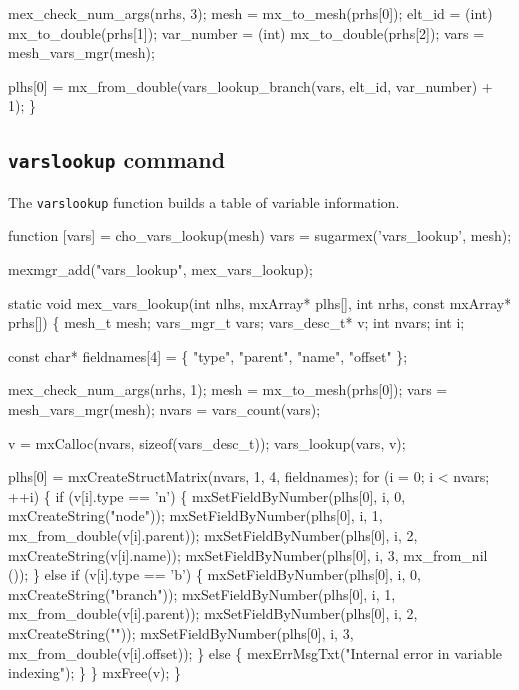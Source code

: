     mex_check_num_args(nrhs, 3);
    mesh        = mx_to_mesh(prhs[0]);
    elt_id      = (int) mx_to_double(prhs[1]);
    var_number  = (int) mx_to_double(prhs[2]);
    vars        = mesh_vars_mgr(mesh);

    plhs[0] = mx_from_double(vars_lookup_branch(vars, elt_id, var_number) + 1);
\}

\nwendcode{}\nwdocspar
 

\subsection{{\tt{}vars{}lookup} command}

The {\tt{}vars{}lookup} function builds a table of variable
information.

\nwenddocs{}\endmoddef
function [vars] = cho_vars_lookup(mesh)
vars = sugarmex('vars_lookup', mesh);
\nwendcode{}\nwdocspar

\nwenddocs{}\plusendmoddef
mexmgr_add("vars_lookup", mex_vars_lookup);
\nwendcode{}\nwdocspar

\nwenddocs{}\plusendmoddef
static void mex_vars_lookup(int nlhs, mxArray* plhs[],
                            int nrhs, const mxArray* prhs[])
\{
    mesh_t       mesh;
    vars_mgr_t   vars;
    vars_desc_t* v;
    int          nvars;
    int          i;

    const char* fieldnames[4] = \{
        "type",
        "parent",
        "name",
        "offset"
    \};

    mex_check_num_args(nrhs, 1);
    mesh        = mx_to_mesh(prhs[0]);
    vars        = mesh_vars_mgr(mesh);
    nvars       = vars_count(vars);

    v = mxCalloc(nvars, sizeof(vars_desc_t));
    vars_lookup(vars, v);

    plhs[0] = mxCreateStructMatrix(nvars, 1, 4, fieldnames);
    for (i = 0; i < nvars; ++i) \{
        if (v[i].type == 'n') \{
            mxSetFieldByNumber(plhs[0], i, 0, mxCreateString("node"));
            mxSetFieldByNumber(plhs[0], i, 1, mx_from_double(v[i].parent));
            mxSetFieldByNumber(plhs[0], i, 2, mxCreateString(v[i].name));
            mxSetFieldByNumber(plhs[0], i, 3, mx_from_nil   ());
        \} else if (v[i].type == 'b') \{
            mxSetFieldByNumber(plhs[0], i, 0, mxCreateString("branch"));
            mxSetFieldByNumber(plhs[0], i, 1, mx_from_double(v[i].parent));
            mxSetFieldByNumber(plhs[0], i, 2, mxCreateString(""));
            mxSetFieldByNumber(plhs[0], i, 3, mx_from_double(v[i].offset));
        \} else \{
            mexErrMsgTxt("Internal error in variable indexing");
        \}
    \}
    mxFree(v);
\}

